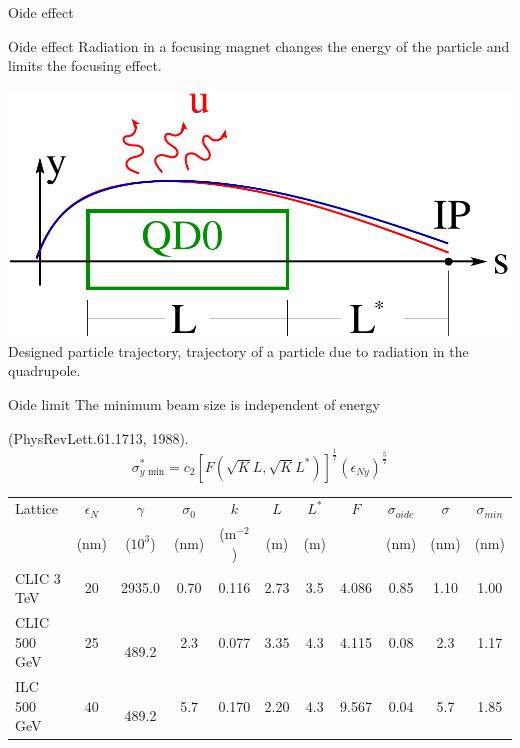\documentclass{beamer}
\begin{document}
\begin{frame}
 \color{blue}\Large Oide effect
\end{frame}
\begin{frame}{Oide effect}
Radiation in a focusing magnet changes the energy of the particle and limits the focusing effect.\par
\centering
 \includegraphics[scale=0.4,angle=0]{Oide.pdf}\\
{\tiny {\color{blue} Designed particle trajectory}, {\color{red} trajectory of a particle due to radiation in the quadrupole}}.\par
\end{frame}
\begin{frame}{Oide limit}
The minimum beam size is independent of energy\par (PhysRevLett.61.1713, 1988).
\begin{equation*}
 \sigma^*_{y \text{ min}} = c_2\left[F(\sqrt{K}L,\sqrt{K}L^*)\right]^\frac{1}{7}(\epsilon_{Ny})^\frac{5}{7}
\end{equation*}
{\scriptsize
\begin{table}[hbt]\hspace*{-0.7cm}
\begin{tabular}{l||c|c|c||c|c|c|c|c||c|c}\hline
Lattice &$\epsilon_N$& $\gamma$& $\sigma_0$&$k$&$L$&$L^*$& $F$ & $\sigma_{oide}$&$\sigma$&$\sigma_{min}$\\
 &(nm)&($10^3$)&(nm)&(m$^{-2}$)&(m)&(m)&&(nm) &(nm)&(nm)\\\hline\hline
CLIC 3 TeV & 20 & 2935.0 & 0.70 & 0.116 & 2.73 &3.5&  4.086  & 0.85 & 1.10& 1.00 \\
CLIC 500 GeV & 25 & $\;\;$489.2 & 2.3 & 0.077 & 3.35 &4.3& 4.115 & 0.08 & 2.3 & 1.17\\
ILC  500 GeV & 40 & $\;\;$489.2 & 5.7 & 0.170 & 2.20 &4.3& 9.567 & 0.04 & 5.7 & 1.85\\\hline
\end{tabular}\label{tabSigmas}
\end{table}\par
}
\end{frame}
\end{document}

